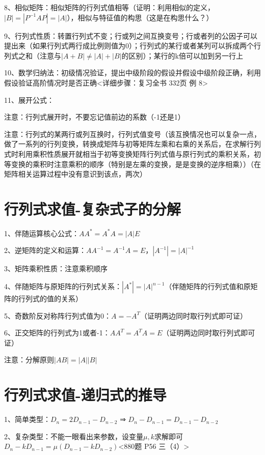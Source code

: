 8、相似矩阵：相似矩阵的行列式值相等（证明：利用相似的定义，$|B|=|P^{-1}AP|=|A|$），相似与特征值的构思（这是在构思什么？）

9、行列式性质：转置行列式不变；行或列之间互换变号；行或者列的公因子可以提出来（如果行列式两行成比例则值为0）；行列式的某行或者某列可以拆成两个行列式之和（注意与$|A+B|\ne |A|+|B|$的区别）；某行的k倍可以加到另一行上

10、数学归纳法：初级情况验证，提出中级阶段的假设并假设中级阶段正确，利用假设验证高阶情况时是否正确<详细步骤：复习全书 332页 例 8>

11、展开公式：

注意：行列式展开时，不要忘记值前边的系数（-1还是1）

注意：行列式的某两行或列互换时，行列式值变号（该互换情况也可以复杂一点，做了一系列的行列变换，转换成矩阵与初等矩阵左乘和右乘的关系后，在求解行列式时利用乘积性质展开就相当于初等变换矩阵行列式值与原行列式的乘积关系，初等变换的乘积时注意乘积的顺序（特别是左乘的变换，是是变换的逆序相乘））（在矩阵相关运算过程中没有意识到该点，两次）

\section{行列式求值-复杂式子的分解}

1、伴随运算核心公式：$AA^*=A^*A=|A|E$

2、逆矩阵的定义和运算：$AA^{-1}=A^{-1}A=E$，$|A^{-1}|=|A|^{-1}$

3、矩阵乘积性质：注意乘积顺序

4、伴随矩阵与原矩阵的行列式关系：$|A^*|=|A|^{n-1}$（伴随矩阵的行列式值和原矩阵的行列式的值的关系）

5、奇数阶反对称阵行列式值为0：$A=-A^T$（证明两边同时取行列式即可证）

6、正交矩阵的行列式为1或者-1：$AA^T=A^TA=E$（证明两边同时取行列式即可证）

注意：分解原则$|AB|=|A||B|$

\section{行列式求值-递归式的推导}

1、简单类型：$D_{n}=2D_{n-1}-D_{n-2}$ ⇒ $D_{n}-D_{n-1} = D_{n-1}-D_{n-2}$

2、复杂类型：不能一眼看出来参数，设变量$\mu ,k$求解即可$D_{n}-kD_{n-1} = \mu (D_{n-1}-kD_{n-2})$<880题 P56 三（4）>

